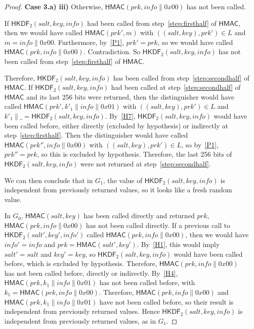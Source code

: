 \documentclass[compsoc, conference, letterpaper, 10pt, times]{IEEEtran}
\newcommand{\HKDF}{\mathsf{HKDF}}
\newcommand{\hkdftwo}{\HKDF_2}
\newcommand{\salt}{\mathit{salt}}
\newcommand{\key}{\mathit{key}}
\newcommand{\info}{\mathit{info}}
\newcommand{\prk}{\mathit{prk}}
\newcommand{\hmac}{\mathsf{HMAC}}
\begin{document}
\begin{proof}
{\bf Case 3.a) iii)}
Otherwise, $\hmac(\prk, \info\|0x00)$ has not been called.
  
If $\hkdftwo(\salt,\key,\info)$ had been called from step~\ref{step:firsthalf} of
$\hmac$, then we would have called $\hmac(\prk', m)$ with
$((\salt,\key),\prk') \in L$ and $m = \info \| 0x00$.
Furthermore, by~\ref{P1}, $\prk' = \prk$, so we would have called $\hmac(\prk, \info\|0x00)$. Contradiction. So $\hkdftwo(\salt,\key,\info)$ has not been called from step~\ref{step:firsthalf} of $\hmac$.

Therefore, $\hkdftwo(\salt,\key,\info)$ has been called from step~\ref{step:secondhalf} of $\hmac$. If $\hkdftwo(\salt,\key,\info)$ had been called at step~\ref{step:secondhalf} of $\hmac$ and its last 256 bits were returned, then the distinguisher would have called $\hmac(\prk', k'_1\|\info\|0x01)$ with $((\salt,\key),\prk') \in L$ and $k'_1 \|\_ = \hkdftwo(\salt, \key, \info)$. By~\ref{H7}, $\hkdftwo(\salt,\key,\info)$ would have been called before, either directly (excluded by hypothesis) or indirectly at step~\ref{step:firsthalf}. Then the distinguisher would have called $\hmac(\prk'', \info\|0x00)$ with $((\salt,\key),\prk') \in L$, so by~\ref{P1}, $\prk'' = \prk$, so this is excluded by hypothesis. Therefore, the last 256 bits of $\hkdftwo(\salt,\key,\info)$ were not returned at step~\ref{step:secondhalf}.

We can then conclude that in $G_1$, the value of $\hkdftwo(\salt,\key,\info)$ is independent from previously returned values, so it looks like a fresh random value.

In $G_0$, $\hmac(\salt,\key)$ has been called directly and returned $\prk$, $\hmac(\prk, \info\|0x00)$ has not been called directly.
%
If a previous call to $\hkdftwo(\salt',\key',\info')$ called $\hmac(\prk, \info\|0x00)$, then we would have $\info' = \info$ and $\prk = \hmac(\salt',\key')$. By~\ref{H1}, this would imply $\salt' = \salt$ and $\key' = \key$, so  $\hkdftwo(\salt,\key,\info)$ would have been called before, which is excluded by hypothesis. Therefore, $\hmac(\prk, \info\|0x00)$ has not been called before, directly or indirectly.
%
By~\ref{H4}, $\hmac(\prk, k_1 \|\info\|0x01)$ has not been called before, with $k_1 = \hmac(\prk, \info\|0x00)$.
%
Therefore, $\hmac(\prk, \info\|0x00)$ and $\hmac(\prk, k_1 \|\info\|0x01)$ have not been called before, so their result is independent from previously returned values. Hence $\hkdftwo(\salt,\key,\info)$ is independent from previously returned values, as in $G_1$.




\end{proof}
\end{document}

